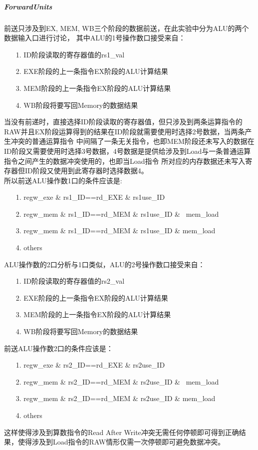 \subparagraph{ForwardUnits}
前送只涉及到EX, MEM, WB三个阶段的数据前送，在此实验中分为ALU的两个数据输入口进行讨论，
其中ALU的1号操作数口接受来自：
\begin{itemize}
    \item [1.] ID阶段读取的寄存器值的rs1\_val
    \item [2.] EXE阶段的上一条指令EX阶段的ALU计算结果
    \item [3.] MEM阶段的上一条指令EX阶段的ALU计算结果
    \item [4.] WB阶段将要写回Memory的数据结果
\end{itemize}
当没有前递时，直接选择ID阶段读取的寄存器值，但只涉及到两条运算指令的RAW并且EX阶段运算得到的结果在ID阶段就需要使用时选择2号数据，当两条产生冲突的普通运算指令
中间隔了一条无关指令，也即MEM阶段还未写入的数据在ID阶段又需要使用时选择3号数据，4号数据是提供给涉及到Load与一条普通运算指令之间产生的数据冲突使用的，也即当Load指令
所对应的内存数据还未写入寄存器但ID阶段又使用到此寄存器时选择数据4。 \\
所以前送ALU操作数1口的条件应该是:
\begin{itemize}
    \item [1.] regw\_exe \& rs1\_ID==rd\_EXE \& rs1use\_ID
    \item [2.] regw\_mem \& rs1\_ID==rd\_MEM \& rs1use\_ID \& ~mem\_load
    \item [3.] regw\_mem \& rs1\_ID==rd\_MEM \& rs1use\_ID \& mem\_load
    \item [4.] others
\end{itemize}
ALU操作数的2口分析与1口类似，ALU的2号操作数口接受来自：
\begin{itemize}
    \item [1.] ID阶段读取的寄存器值的rs2\_val
    \item [2.] EXE阶段的上一条指令EX阶段的ALU计算结果
    \item [3.] MEM阶段的上一条指令EX阶段的ALU计算结果
    \item [4.] WB阶段将要写回Memory的数据结果
\end{itemize}
前送ALU操作数2口的条件应该是：
\begin{itemize}
    \item [1.] regw\_exe \& rs2\_ID==rd\_EXE \& rs2use\_ID
    \item [2.] regw\_mem \& rs2\_ID==rd\_MEM \& rs2use\_ID \& ~mem\_load
    \item [3.] regw\_mem \& rs2\_ID==rd\_MEM \& rs2use\_ID \& mem\_load
    \item [4.] others
\end{itemize}
这样使得涉及到算数指令的Read After Write冲突无需任何停顿即可得到正确结果，使得涉及到Load指令的RAW情形仅需一次停顿即可避免数据冲突。

